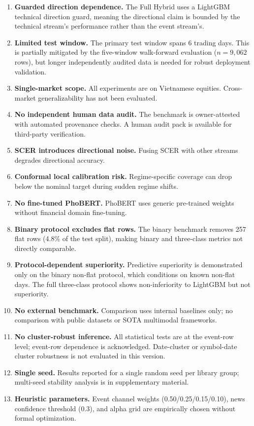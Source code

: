 \documentclass[runningheads]{llncs}
\begin{document}
\begin{enumerate}
\item \textbf{Guarded direction dependence.} The Full Hybrid uses a LightGBM technical direction guard, meaning the directional claim is bounded by the technical stream's performance rather than the event stream's.
\item \textbf{Limited test window.} The primary test window spans 6 trading days. This is partially mitigated by the five-window walk-forward evaluation ($n=9{,}062$ rows), but longer independently audited data is needed for robust deployment validation.
\item \textbf{Single-market scope.} All experiments are on Vietnamese equities. Cross-market generalizability has not been evaluated.
\item \textbf{No independent human data audit.} The benchmark is owner-attested with automated provenance checks. A human audit pack is available for third-party verification.
\item \textbf{SCER introduces directional noise.} Fusing SCER with other streams degrades directional accuracy.
\item \textbf{Conformal local calibration risk.} Regime-specific coverage can drop below the nominal target during sudden regime shifts.
\item \textbf{No fine-tuned PhoBERT.} PhoBERT uses generic pre-trained weights without financial domain fine-tuning.
\item \textbf{Binary protocol excludes flat rows.} The binary benchmark removes 257 flat rows (4.8\% of the test split), making binary and three-class metrics not directly comparable.
\item \textbf{Protocol-dependent superiority.} Predictive superiority is demonstrated only on the binary non-flat protocol, which conditions on known non-flat days. The full three-class protocol shows non-inferiority to LightGBM but not superiority.
\item \textbf{No external benchmark.} Comparison uses internal baselines only; no comparison with public datasets or SOTA multimodal frameworks.
\item \textbf{No cluster-robust inference.} All statistical tests are at the event-row level; event-row dependence is acknowledged. Date-cluster or symbol-date cluster robustness is not evaluated in this version.
\item \textbf{Single seed.} Results reported for a single random seed per library group; multi-seed stability analysis is in supplementary material.
\item \textbf{Heuristic parameters.} Event channel weights (0.50/0.25/0.15/0.10), news confidence threshold (0.3), and alpha grid are empirically chosen without formal optimization.
\end{enumerate}
\end{document}
